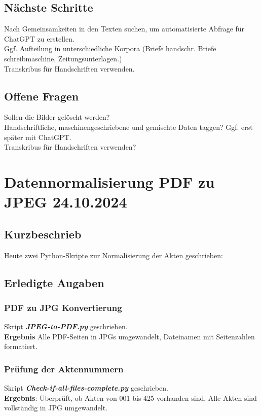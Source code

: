 \documentclass{article}
\begin{document}
\subsection*{Nächste Schritte}
 Nach Gemeinsamkeiten in den Texten suchen, um automatisierte Abfrage für ChatGPT zu erstellen. \\ 
Ggf. Aufteilung in unterschiedliche Korpora (Briefe handschr. Briefe schreibmaschine, Zeitungsunterlagen.)\\
 Transkribus für Handschriften verwenden.

\subsection*{Offene Fragen}
 Sollen die Bilder gelöscht werden?\\
 Handschriftliche, maschinengeschriebene und gemischte Daten taggen? Ggf. erst später mit ChatGPT.\\
 Transkribus für Handschriften verwenden?


\noindent\hrulefill

\section{Datennormalisierung PDF zu JPEG \small 24.10.2024}
\subsection*{Kurzbeschrieb}
Heute zwei Python-Skripte zur Normalisierung der Akten geschrieben:

\subsection*{Erledigte Augaben}
\subsubsection*{\small PDF zu JPG Konvertierung}
 Skript \textbf{\textit{JPEG-to-PDF.py}} geschrieben.  \\
\textbf{Ergebnis} Alle PDF-Seiten in JPGs umgewandelt, Dateinamen mit Seitenzahlen formatiert.

\subsubsection*{\small Prüfung der Aktennummern}
 Skript \textbf{\textit{Check-if-all-files-complete.py}} geschrieben. \\
\textbf{Ergebnis}: Überprüft, ob Akten von 001 bis 425 vorhanden sind. Alle Akten sind vollständig in JPG umgewandelt.
\end{document}
